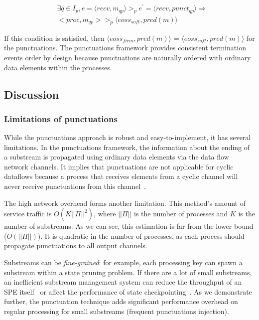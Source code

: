 \begin{align*}
& \exists q \in I_p, e = \langle recv,m_{qp} \rangle >_p e^{'} = \langle recv,punct_{qp}\rangle \Longrightarrow \\ 
& <proc, m_{qp}> >_p \langle eoss_{soft}, pred(m)\rangle
\end{align*}

If this condition is satisfied, then $\langle eoss_{firm}, pred(m)\rangle$ = $\langle eoss_{soft}, pred(m)\rangle$ for the punctuations. The punctuations framework provides consistent termination events order by design because punctuations are naturally ordered with ordinary data elements within the processes.

\subsection{Discussion}

\subsubsection{Limitations of punctuations}

\label{fs-acker-punctuations-limitations}

While the punctuations approach is robust and easy-to-implement, it has several limitations. In the punctuations framework, the information about the ending of a substream is propagated using ordinary data elements via the data flow network channels. It implies that punctuations are not applicable for cyclic dataflows because a process that receives elements from a cyclic channel will never receive punctuations from this channel~\cite{carbone2018scalable}.

The high network overhead forms another limitation. This method's amount of service traffic is $O(K||\Pi||^2)$, where $||\Pi||$ is the number of processes and $K$ is the number of substreams. As we can see, this estimation is far from the lower bound ($O(||\Pi||)$). It is quadratic in the number of processes, as each process should propagate punctuations to all output channels. 

Substreams can be {\em fine-grained}: for example, each processing key can spawn a substream within a state pruning problem. If there are a lot of small substreams, an inefficient substream management system can reduce the throughput of an SPE itself~\cite{Li:2008:OPN:1453856.1453890} or affect the performance of state checkpointing~\cite{zhang2021research}. As we demonstrate further, the punctuation technique adds significant performance overhead on regular processing for small substreams (frequent punctuations injection).

